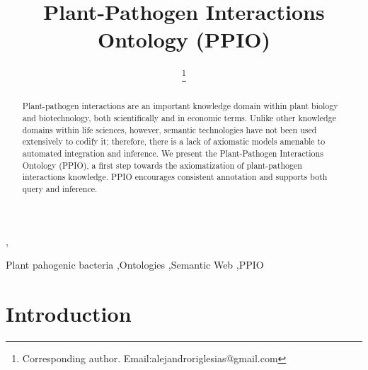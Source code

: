 \documentclass[sw]{iosart2c}
\begin{document}
\begin{frontmatter}

\title{Plant-Pathogen Interactions Ontology (PPIO)}
\runningtitle{}




\author[A]{ \thanks{Corresponding author. Email:alejandroriglesias@gmail.com}},
\author[A]{ }
\author[A]{ }
\author[A]{ }
\runningauthor{}
\address[A]{Biological Informatics Group, Centre for Plant Biotechnology and Genomics (CBGP), Technical University of Madrid (UPM), Spain}

\begin{abstract}
Plant-pathogen interactions are an important knowledge domain within plant biology and biotechnology, both scientifically and in economic terms. Unlike other knowledge domains within   life sciences, however, semantic technologies have not been used extensively to codify it; therefore, there is a lack of axiomatic models amenable to automated integration and inference. We present the Plant-Pathogen Interactions Ontology (PPIO), a first step towards the axiomatization of plant-pathogen interactions knowledge. PPIO encourages consistent annotation and supports both query and inference.
\end{abstract}

\begin{keyword}
 Plant pahogenic bacteria \sep Ontologies \sep Semantic Web \sep PPIO
\end{keyword}

\end{frontmatter}


\section{Introduction}\label{s1}
\end{document}
